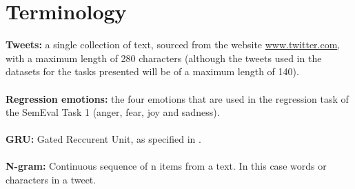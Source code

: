 
\section*{Terminology}

\textbf{Tweets:} a single collection of text, sourced from the website \href{www.twitter.com}{www.twitter.com}, with a maximum length of 280 characters (although the tweets used in the datasets for the tasks presented will be of a maximum length of 140).\\
\\
\textbf{Regression emotions:} the four emotions that are used in the regression task of the SemEval Task 1 (anger, fear, joy and sadness).\\
\\
\textbf{GRU:} Gated Reccurent Unit, as specified in \cite{chung}. \\
\\
\textbf{N-gram:} Continuous sequence of n items from a text. In this case words or characters in a tweet.